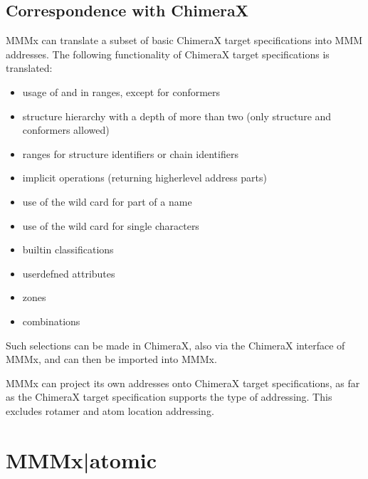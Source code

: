 \documentclass[letterpaper,10pt,english]{sphinxmanual}
\begin{document}
\section{Correspondence with ChimeraX}
\label{\detokenize{MMMx_addresses:correspondence-with-chimerax}}
MMMx can translate a subset of basic ChimeraX target specifications into MMM addresses. The following functionality of ChimeraX target specifications is  translated:
\begin{itemize}
\item {} 
usage of  and  in ranges, except for conformers

\item {} 
structure hierarchy with a depth of more than two (only structure and conformers allowed)

\item {} 
ranges for structure identifiers or chain identifiers

\item {} 
implicit operations (returning higher\sphinxhyphen{}level address parts)

\item {} 
use of the wild card \sphinxcode{\sphinxupquote{*}} for part of a name

\item {} 
use of the wild card  for single characters

\item {} 
built\sphinxhyphen{}in classifications

\item {} 
user\sphinxhyphen{}defned attributes

\item {} 
zones

\item {} 
combinations

\end{itemize}

Such selections can be made in ChimeraX, also via the ChimeraX interface of MMMx, and can then be imported into MMMx.

MMMx can project its own addresses onto ChimeraX target specifications, as far as the ChimeraX target specification supports the type of addressing.
This excludes rotamer and atom location addressing.


\chapter{MMMx|atomic}
\label{\detokenize{MMMx_atomic:mmmx-atomic}}\label{\detokenize{MMMx_atomic:id1}}\label{\detokenize{MMMx_atomic::doc}}
\end{document}
